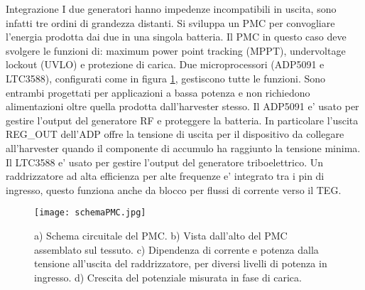 \begin{section}{Integrazione}
    {\color{red}I due generatori hanno impedenze incompatibili in uscita, sono infatti tre ordini di grandezza distanti}. Si sviluppa un PMC per convogliare l'energia prodotta dai due in una singola batteria. Il PMC in questo caso deve svolgere le funzioni di: maximum power point tracking (MPPT), undervoltage lockout (UVLO) e protezione di carica. Due microprocessori (ADP5091 e LTC3588), configurati come in figura \ref{fig:schemaPMC}, gestiscono tutte le funzioni. Sono entrambi progettati per applicazioni a bassa potenza e non richiedono alimentazioni oltre quella prodotta dall'harvester stesso. Il ADP5091 e' usato per gestire l'output del generatore RF e proteggere la batteria. In particolare l'uscita REG\_OUT dell'ADP offre la tensione di uscita per il dispositivo da collegare all'harvester quando il componente di accumulo ha raggiunto la tensione minima. Il LTC3588 e' usato per gestire l'output del generatore triboelettrico. Un raddrizzatore ad alta efficienza per alte frequenze e' integrato  tra i pin di ingresso, questo funziona anche da blocco per flussi di corrente verso il TEG.

    \begin{figure}[hbt!]
        \texttt{[image: schemaPMC.jpg]}
        \centering
        \caption{a) Schema circuitale del PMC. b) Vista dall'alto del PMC assemblato sul tessuto. c) Dipendenza di corrente e potenza dalla tensione all'uscita del raddrizzatore, per diversi livelli di potenza in ingresso. d) Crescita del potenziale misurata in fase di carica.\cite{kouWearableAllFabricHybrid2024}}
        \label{fig:schemaPMC}
    \end{figure}


\end{section}
